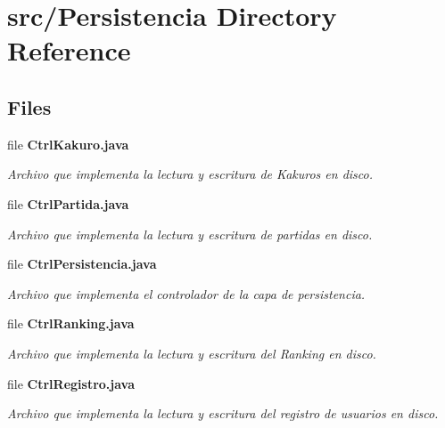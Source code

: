 \section{src/\+Persistencia Directory Reference}
\label{dir_29ffd41bc1560951d3c4e0a275efecca}
\subsection*{Files}
\begin{DoxyCompactItemize}
\item 
file \textbf{ Ctrl\+Kakuro.\+java}
\begin{DoxyCompactList}\small\item\em Archivo que implementa la lectura y escritura de Kakuros en disco. \end{DoxyCompactList}\item 
file \textbf{ Ctrl\+Partida.\+java}
\begin{DoxyCompactList}\small\item\em Archivo que implementa la lectura y escritura de partidas en disco. \end{DoxyCompactList}\item 
file \textbf{ Ctrl\+Persistencia.\+java}
\begin{DoxyCompactList}\small\item\em Archivo que implementa el controlador de la capa de persistencia. \end{DoxyCompactList}\item 
file \textbf{ Ctrl\+Ranking.\+java}
\begin{DoxyCompactList}\small\item\em Archivo que implementa la lectura y escritura del Ranking en disco. \end{DoxyCompactList}\item 
file \textbf{ Ctrl\+Registro.\+java}
\begin{DoxyCompactList}\small\item\em Archivo que implementa la lectura y escritura del registro de usuarios en disco. \end{DoxyCompactList}\end{DoxyCompactItemize}
